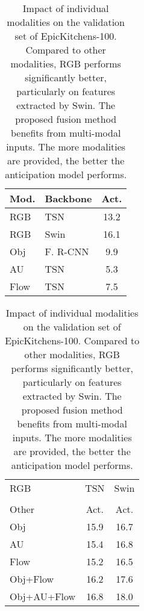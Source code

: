 \documentclass[10pt,twocolumn,letterpaper,dvipsnames]{article}
\begin{document}
\begin{table}[t]
	\centering
	\setlength\tabcolsep{2pt}
	\begin{subtable}[t]{0.4\linewidth}
 \centering
            
			\begin{tabular}[t]{llc}
				\toprule
				Mod. & Backbone & Act.\\
				\midrule
				RGB & TSN & 13.2 \\
				RGB  & Swin & 16.1 \\
				Obj  & F. R-CNN &9.9 \\
				AU  & TSN& 5.3 \\
				Flow  & TSN & 7.5 \\ 
				\bottomrule	
		\end{tabular}
	\vspace{0.7cm}
	\caption{Results of individual modalities.}
	\label{table:sub_single}
	\end{subtable}\hfill
	\begin{subtable}[t]{0.59\linewidth}
 \centering
            
			\begin{tabular}[t]{lcc}
				\toprule
			\multicolumn{1}{l|}{RGB}	& TSN & Swin  \\ 
				\arrayrulecolor{gray}
                    \cmidrule(lr){2-2} 
                    \cmidrule(lr){3-3}
                    \arrayrulecolor{black} 
                    \\[-.9em]
				 \multicolumn{1}{l|}{Other} & Act. & Act. \\
				\cmidrule{1-3}
				\multicolumn{1}{l|}{Obj} & 15.9 & 16.7  \\
				\multicolumn{1}{l|}{AU} & 15.4 & 16.8  \\
				\multicolumn{1}{l|}{Flow} & 15.2 & 16.5  \\
				\multicolumn{1}{l|}{Obj+Flow} & 16.2 & 17.6 \\
				\multicolumn{1}{l|}{Obj+AU+Flow} & 16.8 & 18.0 \\
				\bottomrule
		\end{tabular}
		\caption{Results of multiple modalities combined with RGB.}
		\label{tab:sub_fusion}
	\end{subtable}
	\caption{Impact of individual modalities on the validation set of EpicKitchens-100. Compared to other modalities, RGB performs significantly better, particularly on features extracted by Swin. The proposed fusion method benefits from multi-modal inputs. The more modalities are provided, the better the anticipation model performs.}
	\label{tab:impact_modality}
\end{table} 
\end{document}
